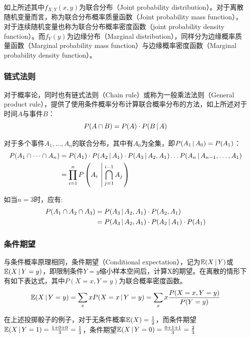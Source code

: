 \documentclass[11pt]{article}
\begin{document}
如上所述其中$f_{X,Y}(x,y)$为联合分布（Joint probability distribution）。对于离散随机变量而言，称为联合分布概率质量函数（Joint probability mass function），对于连续随机变量也称为联合分布概率密度函数（joint probability density function）。而$f_Y(y)$为边缘分布（Marginal distribution），同样分为边缘概率质量函数（Marginal probability mass function）与边缘概率密度函数（Marginal probability density function）。

\subsubsection{链式法则}

对于概率论，同时也有链式法则（Chain rule）或称为一般乘法法则（General product rule），提供了使用条件概率分布计算联合概率分布的方法，如上所述对于时间$A$与事件$B$：
\begin{equation*}
    P(A\cap B) = P(A) \cdot P(B\,\vert\, A)
\end{equation*}

对于多个事件$A_1,\dots,A_n$的联合分布，其中有$A_0$为全集，即$P(A_1\,\vert\, A_0) = P(A_1)$：
\begin{align*}
    P(A_1 \cap \dots \cap A_n) &= P(A_1) \cdot P(A_2\,\vert\, A_1) \cdot P(A_3\,\vert\, A_2,A_1) \dots P(A_n\,\vert\, A_{n-1},\dots,A_1) \\
    &= \prod_{i=1}^{n} P \left( A_i \:\left|\:\bigcap_{j=1}^{i-1} A_j \right. \right)
\end{align*}

如当$n=3$时，应有:
\begin{align*}
    P(A_1 \cap A_2 \cap A_3) &= P(A_3 \,\vert\, A_2, A_1) \cdot P(A_2, A_1) \\
    &= P(A_3 \,\vert\, A_2, A_1) \cdot P(A_2\,\vert\, A_1) \cdot P(A_1)
\end{align*}

\subsubsection{条件期望}

与条件概率原理相同，条件期望（Conditional expectation），记为$\mathbb{E}(X\,\vert\, Y)$或$\mathbb{E}(X\,\vert\, Y=y)$，即限制条件$Y=y$缩小样本空间后，计算X的期望。在离散的情形下有如下表达式，其中$P(X=x,Y=y)$为联合概率密度函数。
\begin{equation*}
    \mathbb{E}(X\,\vert\, Y=y) = \sum_x x P(X=x\,\vert\, Y=y) = \sum_x x \frac{P(X=x,Y=y)}{P(Y=y)}
\end{equation*}

\begin{example}
    在上述投掷骰子的例子，对于无条件概率$\mathbb{E}(X) = \frac{1}{2}$，而条件期望$\mathbb{E}(X\,\vert\, Y=1) = \frac{1+0+0}{3} = \frac{1}{3}$，条件期望$\mathbb{E}(X\,\vert\, Y=0) = \frac{0+1+1}{3} = \frac{2}{3}$
\end{example}
\end{document}
